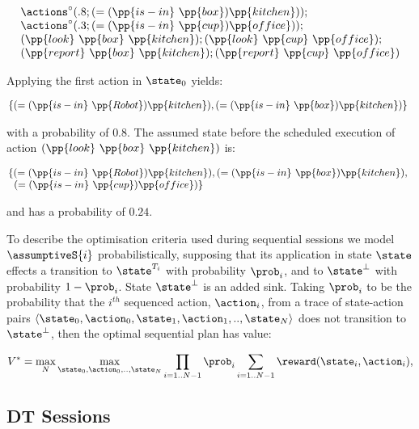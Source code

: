 \small
\[
\begin{array}{l}
\actions^{\circ}(.8;(=(\pp{is-in}~\pp{box})\pp{kitchen}));\\
\actions^{\circ}(.3;(=(\pp{is-in}~\pp{cup})\pp{office}));\\
(\pp{look}~\pp{box}~\pp{kitchen});
(\pp{look}~\pp{cup}~\pp{office});\\
(\pp{report}~\pp{box}~\pp{kitchen}); 
(\pp{report}~\pp{cup}~\pp{office})
\end{array}
\]
\normalsize

\noindent Applying the first action in $\state_0$ yields:


\small
\[
\hspace{-1ex}\begin{array}{l}
\{(=(\pp{is-in}~\pp{Robot})\pp{kitchen}),(=(\pp{is-in}~\pp{box})\pp{kitchen})\}
\end{array}
\]
\normalsize

\noindent with a probability of $0.8$. The assumed state before the
scheduled execution of action $(\pp{look}~\pp{box}~\pp{kitchen})$ is:

\small
\[
\hspace{-1ex}\begin{array}{l}
\{(=(\pp{is-in}~\pp{Robot})\pp{kitchen}),
(=(\pp{is-in}~\pp{box})\pp{kitchen}), \\\;\;(=(\pp{is-in}~\pp{cup})\pp{office})\}
\end{array}
 \]
\normalsize

and has a probability of $0.24$.

To describe the optimisation criteria used during sequential sessions
we model $\assumptiveS{i}$ probabilistically, supposing that its
application in state $\state$ effects a transition to $\state^{T_i}$
with probability $\prob_i$, and to $\state^\bot$ with probability $1 -
\prob_i$. State $\state^\bot$ is an added sink. Taking $\prob_i$ to be
the probability that the $i^{th}$ sequenced action, $\action_i$, from
a trace of state-action pairs $\langle \state_0, \action_0,\state_1,
\action_1,.., \state_N \rangle$ does not transition to $\state^\bot$,
then the optimal sequential plan has value:

\small
\[
V^* = \max_N \max_{\state_0, \action_0,.., \state_N} \prod_{i=1..N-1} \prob_i \sum_{i=1..N-1}
\reward(\state_i, \action_i),
\]
\normalsize

\subsection{DT Sessions}

